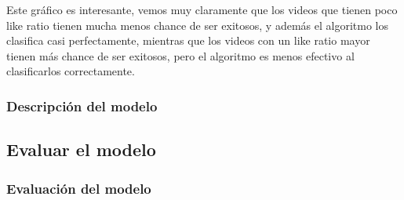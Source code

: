         Este gráfico es interesante, vemos muy claramente que los videos que
        tienen poco like ratio tienen mucha menos chance de ser exitosos, y
        además el algoritmo los clasifica casi perfectamente, mientras que los
        videos con un like ratio mayor tienen más chance de ser exitosos, pero
        el algoritmo es menos efectivo al clasificarlos correctamente.

        \newpage

    \subsubsection{Descripción del modelo}
\subsection{Evaluar el modelo}
    \subsubsection{Evaluación del modelo}
